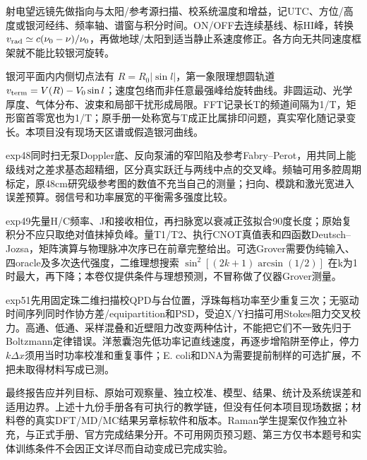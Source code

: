 射电望远镜先做指向与太阳/参考源扫描、校系统温度和增益，记UTC、方位/高度或银河经纬、频率轴、谱窗与积分时间。ON/OFF去连续基线、标HI峰，转换 $v_{\rm rad}\simeq c(\nu_0-\nu)/\nu_0$，再做地球/太阳到适当静止系速度修正。各方向无共同速度框架就不能比较银河旋转。

银河平面内内侧切点法有 $R=R_0|\sin l|$，第一象限理想圆轨道 $v_{\rm term}=V(R)-V_0\sin l$；速度包络而非任意最强峰给旋转曲线。非圆运动、光学厚度、气体分布、波束和局部干扰形成局限。FFT记录长T的频道间隔为1/T，矩形窗首零宽也为1/T；原手册一处称宽与T成正比属排印问题，真实窄化随记录变长。本项目没有现场天区谱或假造银河曲线。

exp48同时扫无泵Doppler底、反向泵浦的窄凹陷及参考Fabry--Perot，用共同上能级线对之差求基态超精细，区分真实跃迁与两线中点的交叉峰。频轴可用多腔周期标定，原48cm研究级参考图的数值不充当自己的测量；扫向、模跳和激光宽进入误差预算。弱信号和功率展宽的平衡需多强度比较。

exp49先量H/C频率、J和接收相位，再扫脉宽以衰减正弦拟合90度长度；原始复积分不应只取绝对值抹掉负峰。量T1/T2、执行CNOT真值表和四函数Deutsch--Jozsa，矩阵演算与物理脉冲次序已在前章完整给出。可选Grover需要伪纯输入、四oracle及多次迭代强度，二维理想搜索 $\sin^2[(2k+1)\arcsin(1/2)]$ 在k为1时最大，再下降；本卷仅提供条件与理想预测，不冒称做了仪器Grover测量。

exp51先用固定珠二维扫描校QPD与台位置，浮珠每档功率至少重复三次；无驱动时间序列同时作协方差/equipartition和PSD，受迫X/Y扫描可用Stokes阻力交叉校力。高通、低通、采样混叠和近壁阻力改变两种估计，不能把它们不一致先归于Boltzmann定律错误。洋葱囊泡先低功率记直线速度，再逐步增陷阱至停止，停力 $k\Delta x$须用当时功率校准和重复事件；E. coli和DNA为需要提前制样的可选扩展，不把未取得材料写成已测。

最终报告应并列目标、原始可观察量、独立校准、模型、结果、统计及系统误差和适用边界。上述十九份手册各有可执行的教学链，但没有任何本项目现场数据；材料卷的真实DFT/MD/MC结果另章标软件和版本。Raman学生提案仅作独立补充，与正式手册、官方完成结果分开。不可用网页预习题、第三方仅书本题号和实体训练条件不会因正文详尽而自动变成已完成实验。
